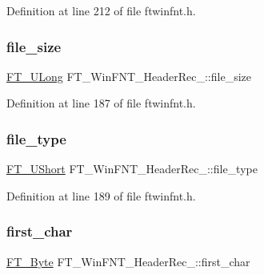 Definition at line 212 of file ftwinfnt.\+h.

\mbox{\label{struct_f_t___win_f_n_t___header_rec___ae311838f941463d96f4ee570de58a359}} 
\subsubsection{\texorpdfstring{file\_size}{file\_size}}
{\footnotesize\ttfamily \mbox{\hyperlink{fttypes_8h_a4fac88bdba78eb76b505efa6e4fbf3f5}{F\+T\+\_\+\+U\+Long}} F\+T\+\_\+\+Win\+F\+N\+T\+\_\+\+Header\+Rec\+\_\+\+::file\+\_\+size}



Definition at line 187 of file ftwinfnt.\+h.

\mbox{\label{struct_f_t___win_f_n_t___header_rec___a0ca7a317967750673fd06f98af5f8329}} 
\subsubsection{\texorpdfstring{file\_type}{file\_type}}
{\footnotesize\ttfamily \mbox{\hyperlink{fttypes_8h_a937f6c17cf5ffd09086d8610c37b9f58}{F\+T\+\_\+\+U\+Short}} F\+T\+\_\+\+Win\+F\+N\+T\+\_\+\+Header\+Rec\+\_\+\+::file\+\_\+type}



Definition at line 189 of file ftwinfnt.\+h.

\mbox{\label{struct_f_t___win_f_n_t___header_rec___acb8e2b39580ebab4368ab5b001eef67c}} 
\subsubsection{\texorpdfstring{first\_char}{first\_char}}
{\footnotesize\ttfamily \mbox{\hyperlink{fttypes_8h_a51f26183ca0c9f4af958939648caeccd}{F\+T\+\_\+\+Byte}} F\+T\+\_\+\+Win\+F\+N\+T\+\_\+\+Header\+Rec\+\_\+\+::first\+\_\+char}



